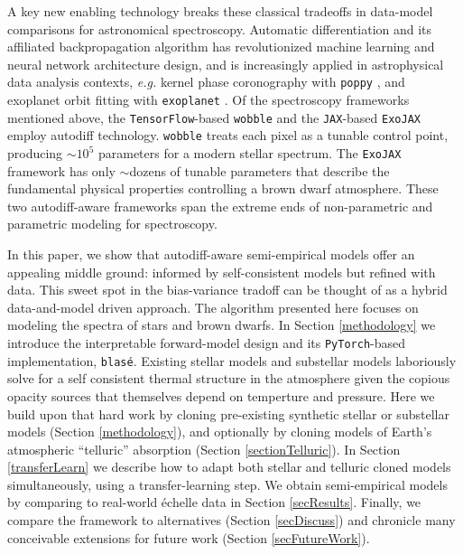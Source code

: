 \documentclass[twocolumn]{aastex631}
\begin{document}
A key new enabling technology breaks these classical tradeoffs in data-model comparisons for astronomical spectroscopy.  Automatic differentiation \citep[``autodiff'' or ``autograd'',][]{2015arXiv150205767G, 2016PhDT.......317M} and its affiliated backpropagation algorithm \citep{kelley1960,Linnainmaa1976TaylorEO, 1986Natur.323..533R, 1990JGCD...13..926D} has revolutionized machine learning and neural network architecture design, and is increasingly applied in astrophysical data analysis contexts, \emph{e.g.} kernel phase coronography with \texttt{poppy} \citep{2021ApJ...907...40P}, and exoplanet orbit fitting with \texttt{exoplanet} \citep{2021JOSS....6.3285F}.  Of the spectroscopy frameworks mentioned above, the \texttt{TensorFlow}-based \citep{tensorflow2015-whitepaper} \texttt{wobble} and the \texttt{JAX}-based \citep{jax2018github} \texttt{ExoJAX} employ autodiff technology.  \texttt{wobble} treats each pixel as a tunable control point, producing $\sim10^5$ parameters for a modern stellar spectrum.  The \texttt{ExoJAX} framework has only $\sim$dozens of tunable parameters that describe the fundamental physical properties controlling a brown dwarf atmosphere.  These two autodiff-aware frameworks span the extreme ends of non-parametric and parametric modeling for spectroscopy.

In this paper, we show that autodiff-aware semi-empirical models offer an appealing middle ground: informed by self-consistent models but refined with data.  This sweet spot in the bias-variance tradoff can be thought of as a hybrid data-and-model driven approach.  The algorithm presented here focuses on modeling the spectra of stars and brown dwarfs.  In Section \ref{methodology} we introduce the interpretable forward-model design and its \texttt{PyTorch}-based \citep{2019arXiv191201703P} implementation, \texttt{blas\'e}.  Existing stellar models \citep[\emph{e.g.}][]{husser13} and substellar models \citep[\emph{e.g.}][]{2021ApJ...920...85M} laboriously solve for a self consistent thermal structure in the atmosphere given the copious opacity sources that themselves depend on temperture and pressure.  Here we build upon that hard work by cloning pre-existing synthetic stellar or substellar models (Section \ref{methodology}), and optionally by cloning models of Earth's atmospheric ``telluric'' absorption (Section \ref{sectionTelluric}). In Section \ref{transferLearn}  we describe how to adapt both stellar and telluric cloned models simultaneously, using a transfer-learning step.  We obtain semi-empirical models by comparing to real-world \'echelle data in Section \ref{secResults}. Finally, we compare the framework to alternatives (Section \ref{secDiscuss}) and chronicle many conceivable extensions for future work (Section \ref{secFutureWork}).
\end{document}
